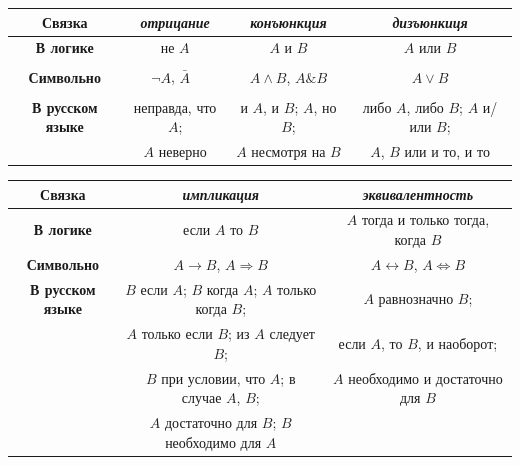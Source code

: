 \documentclass[12pt,notitlepage]{article}
\theoremstyle{plain}
\theoremstyle{definition}
\theoremstyle{plain}
\newcommand{\1}{\mathbf{1}}
\newcommand{\0}{\mathbf{0}}
\newcommand{\mcomm}[1]{}
\begin{document}
\begin{center}
	\begin{tabular}{|c | c | c | c |}
		\hline
		{\bf Связка} & \it отрицание  & \it конъюнкция & \it дизъюнкиця \\
		\hline
		\bf В логике & не $A$  &$A$ и $B$&$A$ или $B$\\
		\hline
		\bf Символьно & $\neg A$, $\bar A\phantom{\dfrac{1}{2}}$  &$A \wedge B$, $A \mathop{\&} B$&$A \vee B$\\
		\hline
		\bf В русском языке & неправда, что $A$; &и $A$, и $B$; $A$, но $B$; & либо $A$, либо $B$; $A$ и/или $B$; \\
		&   $A$ неверно &  $A$ несмотря на $B$ & $A$, $B$ или и то, и то\\
		\hline
	\end{tabular}
	
	\vspace{10mm}
	
	\begin{tabular}{|c | c | c |}
		\hline
		\bf Связка & \it импликация & \it эквивалентность \\
		\hline
		\bf В логике & если $A$ то $B$ &$A$ тогда и только тогда, когда $B$\\
		\hline
		\bf Символьно & $A \to B$, $A \Rightarrow B$ &$A \leftrightarrow B$, $A \Leftrightarrow B$\\
		\hline
		\bf В русском языке & $B$ если $A$; $B$ когда $A$; $A$ только когда $B$;   & $A$ равнозначно $B$; \\
		&$A$ только если $B$; из $A$ следует $B$; & если $A$, то $B$, и наоборот;  \\
		& $B$ при условии, что $A$; в случае $A$, $B$;  & $A$ необходимо и достаточно для $B$ \\
		& $A$ достаточно для $B$; $B$ необходимо для $A$ &  \\
		\hline
	\end{tabular}
\end{center}
\mcomm{}
\end{document}
